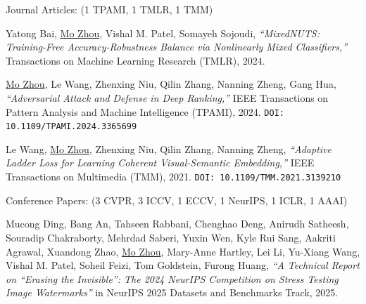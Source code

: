 \documentclass[10pt,margin,line,pifont,palatino,courier]{res}
\begin{document}
\begin{resume}
{\sc Journal Articles:} \hfill(1 TPAMI, 1 TMLR, 1 TMM)\\

\begin{enumerate}[noitemsep, leftmargin=*, label={[J0{\arabic*}]}]

\item Yatong Bai, \underline{Mo Zhou}, Vishal M. Patel, Somayeh Sojoudi,
\reversemarginpar{}
\textit{``MixedNUTS: Training-Free Accuracy-Robustness Balance via Nonlinearly Mixed Classifiers,''}
Transactions on Machine Learning Research (TMLR), 2024.

\item \underline{Mo Zhou},
\reversemarginpar{}
Le Wang, Zhenxing Niu, Qilin Zhang, Nanning Zheng, Gang Hua,
\textit{``Adversarial Attack and Defense in Deep Ranking,''}
IEEE Transactions on Pattern Analysis and Machine Intelligence (TPAMI), 2024.
\texttt{\small DOI: 10.1109/TPAMI.2024.3365699}

\item Le Wang, \underline{Mo Zhou},
\reversemarginpar{}
Zhenxing Niu, Qilin Zhang, Nanning Zheng,
\textit{``Adaptive Ladder Loss for Learning Coherent Visual-Semantic Embedding,''}
IEEE Transactions on Multimedia (TMM), 2021.
\texttt{\small DOI: 10.1109/TMM.2021.3139210}

\end{enumerate}

    {\sc Conference Papers:}\hfill
    (3 CVPR, 3 ICCV, 1 ECCV, 1 NeurIPS, 1 ICLR, 1 AAAI)\\

\begin{enumerate}[noitemsep, leftmargin=*, label={[C{\arabic*}]}]

\item Mucong Ding, Bang An, Tahseen Rabbani, Chenghao Deng, Anirudh Satheesh,
        Souradip Chakraborty, Mehrdad Saberi, Yuxin Wen, Kyle Rui Sang,
        Aakriti Agrawal, Xuandong Zhao, \underline{Mo Zhou}, Mary-Anne Hartley,
        Lei Li, Yu-Xiang Wang, Vishal M. Patel, Soheil Feizi, Tom Goldstein,
        Furong Huang,
\textit{``A Technical Report on ``Erasing the Invisible'': The 2024 NeurIPS Competition on Stress Testing Image Watermarks''}
in NeurIPS 2025 Datasets and Benchmarks Track, 2025.


\end{enumerate}
\end{resume}
\end{document}
